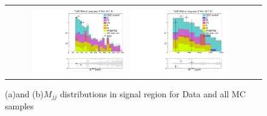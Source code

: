    \begin{table}[ht]
     \caption{\label{table:SReventcount}Number on events in SR data and all MC samples. The QCD prediction has been corrected for the unidirectional MET-bias described in section \ref{dihad:subsec:stability} for the combination of the systematic errors.}
   \end{table}
   
       \begin{figure}[tbh!]
           \centering
           \begin{tabular}{cc}
             \includegraphics[width=0.40\textwidth]{PLOTS/diTauHadLSQCDPlots/UnblindedUpdate/LS_SR/LS_SignalRegion/h_met_log.pdf}
             \includegraphics[width=0.40\textwidth]{PLOTS/diTauHadLSQCDPlots/UnblindedUpdate/LS_SR/LS_SignalRegion/h_dijetinvariantmass_log.pdf}
           \end{tabular}
           \caption{(a)\met and (b)$M_{jj}$ distributions in signal region for Data and all MC samples}
           \label{fig:LS_SR_h_met_dijetinvariantmass_log}
         \end{figure}
         
